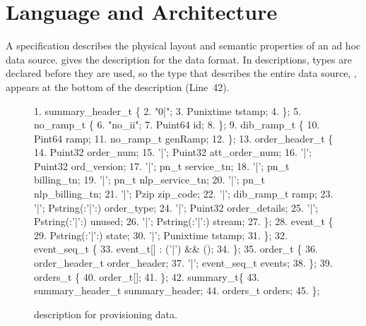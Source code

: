 \section{Language and Architecture}
\label{section:pads}

A \pads{} specification describes the physical layout and semantic
properties of an ad hoc data source.   gives
the \pads{} description for the \dibbler{} data format.  In \pads{}
descriptions, types are declared before they are used, so the type
that describes the entire data source, , appears at the
bottom of the description (Line~42).
\begin{figure}
\begin{scriptsize}
\begin{code}
{ 1}.   summary\_header\_t \{
{ 2}.  "0|";
{ 3}.  Punixtime tstamp;
{ 4}. \};
\mbox{}
{ 5}.  no\_ramp\_t \{
{ 6}.  "no\_ii";
{ 7}.  Puint64 id;
{ 8}. \};
\mbox{}
{ 9}.  dib\_ramp\_t \{
{10}.   Pint64     ramp;
{11}.   no\_ramp\_t  genRamp;
{12}. \};
\mbox{}
{13}.  order\_header\_t \{
{14}.        Puint32             order\_num;
{15}.  '|';  Puint32             att\_order\_num;
{16}.  '|';  Puint32             ord\_version;
{17}.  '|';   pn\_t           service\_tn;
{18}.  '|';   pn\_t           billing\_tn;
{19}.  '|';   pn\_t           nlp\_service\_tn;
{20}.  '|';   pn\_t           nlp\_billing\_tn;
{21}.  '|';   Pzip           zip\_code;
{22}.  '|';  dib\_ramp\_t          ramp;
{23}.  '|';  Pstring(:'|':)      order\_type;
{24}.  '|';  Puint32             order\_details;
{25}.  '|';  Pstring(:'|':)      unused;
{26}.  '|';  Pstring(:'|':)      stream;
{27}. \};
\mbox{}
{28}.  event\_t \{
{29}.        Pstring(:'|':)    state;   
{30}.   '|'; Punixtime         tstamp;
{31}. \};
\mbox{}
{32}.  event\_seq\_t \{
{33}.   event\_t[] : ('|') && ();
{34}. \};
\mbox{}
{35}.   order\_t \{
{36}.        order\_header\_t  order\_header;
{37}.   '|'; event\_seq\_t     events;
{38}. \};
\mbox{}
{39}.  orders\_t \{
{40}.   order\_t[];
{41}. \};
\mbox{}
{42}.   summary\_t\{
{43}.   summary\_header\_t  summary\_header;
{44}.   orders\_t          orders;
{45}. \};
\end{code}
\end{scriptsize}
\caption{\pads{} description for \dibbler{} provisioning data.}
\label{figure:dibbler}
\end{figure}

